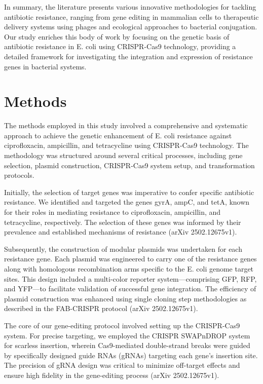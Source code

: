 \documentclass{article}
\begin{document}
In summary, the literature presents various innovative methodologies for tackling antibiotic resistance, ranging from gene editing in mammalian cells to therapeutic delivery systems using phages and ecological approaches to bacterial conjugation. Our study enriches this body of work by focusing on the genetic basis of antibiotic resistance in E. coli using CRISPR-Cas9 technology, providing a detailed framework for investigating the integration and expression of resistance genes in bacterial systems.

\section{Methods}
The methods employed in this study involved a comprehensive and systematic approach to achieve the genetic enhancement of E. coli resistance against ciprofloxacin, ampicillin, and tetracycline using CRISPR-Cas9 technology. The methodology was structured around several critical processes, including gene selection, plasmid construction, CRISPR-Cas9 system setup, and transformation protocols.

Initially, the selection of target genes was imperative to confer specific antibiotic resistance. We identified and targeted the genes gyrA, ampC, and tetA, known for their roles in mediating resistance to ciprofloxacin, ampicillin, and tetracycline, respectively. The selection of these genes was informed by their prevalence and established mechanisms of resistance (arXiv 2502.12675v1).

Subsequently, the construction of modular plasmids was undertaken for each resistance gene. Each plasmid was engineered to carry one of the resistance genes along with homologous recombination arms specific to the E. coli genome target sites. This design included a multi-color reporter system—comprising GFP, RFP, and YFP—to facilitate validation of successful gene integration. The efficiency of plasmid construction was enhanced using single cloning step methodologies as described in the FAB-CRISPR protocol (arXiv 2502.12675v1).

The core of our gene-editing protocol involved setting up the CRISPR-Cas9 system. For precise targeting, we employed the CRISPR SWAPnDROP system for scarless insertion, wherein Cas9-mediated double-strand breaks were guided by specifically designed guide RNAs (gRNAs) targeting each gene's insertion site. The precision of gRNA design was critical to minimize off-target effects and ensure high fidelity in the gene-editing process (arXiv 2502.12675v1).
\end{document}

